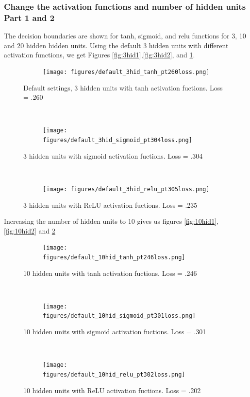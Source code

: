 \documentclass[]{article}
\begin{document}
\subsubsection{Change the activation functions and number of hidden units Part 1 and 2}
The decision boundaries are shown for tanh, sigmoid, and relu functions for 3, 10 and 20 hidden hidden units.
Using the default 3 hidden units with different activation functions, we get Figures \ref{fig:3hid1},\ref{fig:3hid2}, and \ref{fig:3hid3}.
\begin{figure}[ht]
    \centering
    \begin{subfigure}
        \centering
        \texttt{[image: figures/default\_3hid\_tanh\_pt260loss.png]}
    \end{subfigure}%
    \caption{Default settings, 3 hidden units with tanh activation fuctions. Loss = .260}
\label{fig:3hid1}
    ~ 
    \begin{subfigure}
        \centering
        \texttt{[image: figures/default\_3hid\_sigmoid\_pt304loss.png]}
    \end{subfigure}
    \caption{3 hidden units with sigmoid activation fuctions. Loss = .304}
\label{fig:3hid2}
    ~ 
    \begin{subfigure}
        \centering
        \texttt{[image: figures/default\_3hid\_relu\_pt305loss.png]}
    \end{subfigure}
    \caption{3 hidden units with ReLU activation fuctions. Loss = .235}
\label{fig:3hid3}
\end{figure}

Increasing the number of hidden units to 10 gives us figures \ref{fig:10hid1}, \ref{fig:10hid2} and  \ref{fig:10hid3}

\begin{figure}[ht]
    \centering
    \begin{subfigure}
        \centering
        \texttt{[image: figures/default\_10hid\_tanh\_pt246loss.png]}
    \end{subfigure}%
    \caption{10 hidden units with tanh activation fuctions. Loss = .246}
 \label{fig:10hid1}
    ~ 
    \begin{subfigure}
        \centering
        \texttt{[image: figures/default\_10hid\_sigmoid\_pt301loss.png]}
    \end{subfigure}
    \caption{10 hidden units with sigmoid activation fuctions. Loss = .301}
 \label{fig:10hid2}
    ~ 
    \begin{subfigure}
        \centering
        \texttt{[image: figures/default\_10hid\_relu\_pt302loss.png]}
    \end{subfigure}
    \caption{10 hidden units with ReLU activation fuctions. Loss = .202}
 \label{fig:10hid3}
\end{figure}
\end{document}
